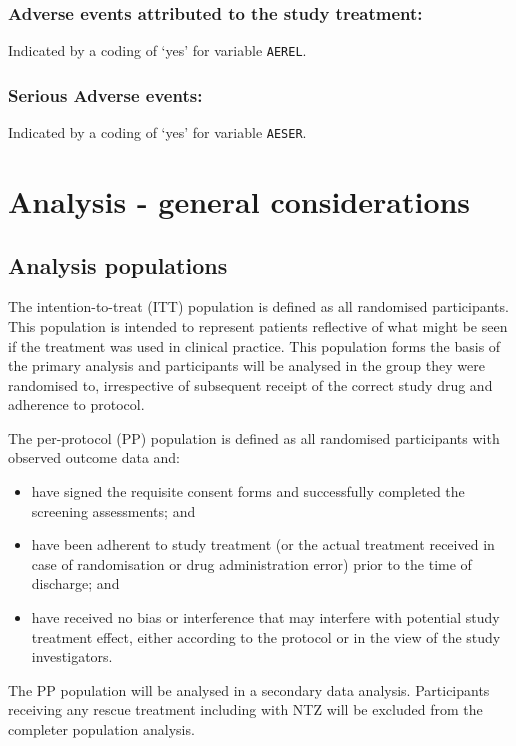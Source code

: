 \documentclass[a4paper]{article}
\begin{document}
\subsubsection{Adverse events attributed to the study treatment:}

Indicated by a coding of `yes' for variable \texttt{AEREL}. 

\subsubsection{Serious Adverse events:}

Indicated by a coding of `yes' for variable \texttt{AESER}.

\section{Analysis - general considerations}

\subsection{Analysis populations}

The intention-to-treat (ITT) population is defined as all randomised participants.
This population is intended to represent patients reflective of what might be seen if the treatment was used in clinical practice.
This population forms the basis of the primary analysis and participants will be analysed in the group they were randomised to, irrespective of subsequent receipt of the correct study drug and adherence to protocol.

The per-protocol (PP) population is defined as all randomised participants with observed outcome data and:
\begin{itemize}
    \item have signed the requisite consent forms and successfully completed the screening assessments; and
    \item have been adherent to study treatment (or the actual treatment received in case of randomisation or drug administration error) prior to the time of discharge; and
    \item have received no bias or interference that may interfere with potential study treatment effect, either according to the protocol or in the view of the study investigators.
\end{itemize}
The PP population will be analysed in a secondary data analysis.
Participants receiving any rescue treatment including with NTZ will be excluded from the completer population analysis.
\end{document}
